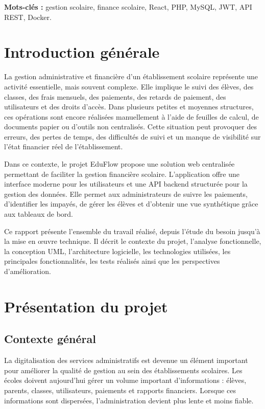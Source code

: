 \documentclass[12pt,a4paper]{report}
\begin{document}
\textbf{Mots-clés :} gestion scolaire, finance scolaire, React, PHP, MySQL, JWT, API REST, Docker.

\tableofcontents
\listoffigures
\listoftables

\clearpage
{}

\chapter*{Introduction générale}

La gestion administrative et financière d'un établissement scolaire représente une activité essentielle, mais souvent complexe. Elle implique le suivi des élèves, des classes, des frais mensuels, des paiements, des retards de paiement, des utilisateurs et des droits d'accès. Dans plusieurs petites et moyennes structures, ces opérations sont encore réalisées manuellement à l'aide de feuilles de calcul, de documents papier ou d'outils non centralisés. Cette situation peut provoquer des erreurs, des pertes de temps, des difficultés de suivi et un manque de visibilité sur l'état financier réel de l'établissement.

Dans ce contexte, le projet EduFlow propose une solution web centralisée permettant de faciliter la gestion financière scolaire. L'application offre une interface moderne pour les utilisateurs et une API backend structurée pour la gestion des données. Elle permet aux administrateurs de suivre les paiements, d'identifier les impayés, de gérer les élèves et d'obtenir une vue synthétique grâce aux tableaux de bord.

Ce rapport présente l'ensemble du travail réalisé, depuis l'étude du besoin jusqu'à la mise en œuvre technique. Il décrit le contexte du projet, l'analyse fonctionnelle, la conception UML, l'architecture logicielle, les technologies utilisées, les principales fonctionnalités, les tests réalisés ainsi que les perspectives d'amélioration.

\chapter{Présentation du projet}

\section{Contexte général}

La digitalisation des services administratifs est devenue un élément important pour améliorer la qualité de gestion au sein des établissements scolaires. Les écoles doivent aujourd'hui gérer un volume important d'informations : élèves, parents, classes, utilisateurs, paiements et rapports financiers. Lorsque ces informations sont dispersées, l'administration devient plus lente et moins fiable.
\end{document}
